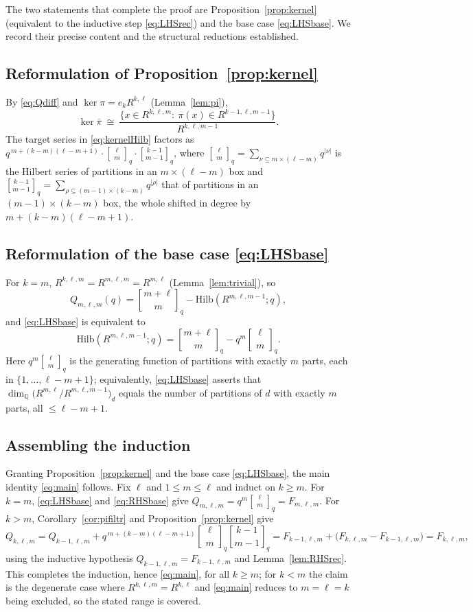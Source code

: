 \documentclass{amsart}
\theoremstyle{definition}
\newcommand{\Hilb}{\mathrm{Hilb}}
\newcommand{\qbin}[2]{\genfrac{[}{]}{0pt}{}{#1}{#2}_q}
\newcommand{\Q}{\mathbb{Q}}
\newcommand{\rkl}{R^{k,\ell}}
\newcommand{\Rklm}{R^{k,\ell,m}}
\begin{document}
The two statements that complete the proof are Proposition~\ref{prop:kernel}
(equivalent to the inductive step \eqref{eq:LHSrec}) and the base case
\eqref{eq:LHSbase}. We record their precise content and the structural reductions
established.

\subsection*{Reformulation of Proposition~\ref{prop:kernel}}
By \eqref{eq:Qdiff} and $\ker\pi=e_k\rkl$ (Lemma~\ref{lem:pi}),
\[
\ker\overline\pi\ \cong\
\frac{\{x\in\Rklm:\ \pi(x)\in R^{k-1,\ell,m-1}\}}{R^{k,\ell,m-1}} .
\]
The target series in \eqref{eq:kernelHilb} factors as
$q^{\,m+(k-m)(\ell-m+1)}\cdot\qbin{\ell}{m}\cdot\qbin{k-1}{m-1}$, where
$\qbin{\ell}{m}=\sum_{\nu\subseteq m\times(\ell-m)}q^{|\nu|}$ is the Hilbert series
of partitions in an $m\times(\ell-m)$ box and
$\qbin{k-1}{m-1}=\sum_{\rho\subseteq(m-1)\times(k-m)}q^{|\rho|}$ that of partitions
in an $(m-1)\times(k-m)$ box, the whole shifted in degree by $m+(k-m)(\ell-m+1)$.

\subsection*{Reformulation of the base case \eqref{eq:LHSbase}}
For $k=m$, $\Rklm=R^{m,\ell,m}=R^{m,\ell}$ (Lemma~\ref{lem:trivial}), so
\[
Q_{m,\ell,m}(q)=\qbin{m+\ell}{m}-\Hilb(R^{m,\ell,m-1};q),
\]
and \eqref{eq:LHSbase} is equivalent to
\begin{equation}\label{eq:basecum}
\Hilb(R^{m,\ell,m-1};q)=\qbin{m+\ell}{m}-q^{m}\qbin{\ell}{m}.
\end{equation}
Here $q^{m}\qbin{\ell}{m}$ is the generating function of partitions with exactly $m$
parts, each in $\{1,\dots,\ell-m+1\}$; equivalently, \eqref{eq:LHSbase} asserts that
$\dim_\Q\big(R^{m,\ell}/R^{m,\ell,m-1}\big)_d$ equals the number of partitions of $d$
with exactly $m$ parts, all $\le\ell-m+1$.

\subsection*{Assembling the induction}
Granting Proposition~\ref{prop:kernel} and the base case \eqref{eq:LHSbase}, the main
identity \eqref{eq:main} follows. Fix $\ell$ and $1\le m\le\ell$ and induct on
$k\ge m$. For $k=m$, \eqref{eq:LHSbase} and \eqref{eq:RHSbase} give
$Q_{m,\ell,m}=q^m\qbin{\ell}{m}=F_{m,\ell,m}$. For $k>m$,
Corollary~\ref{cor:pifiltr} and Proposition~\ref{prop:kernel} give
\[
Q_{k,\ell,m}=Q_{k-1,\ell,m}+q^{\,m+(k-m)(\ell-m+1)}\qbin{\ell}{m}\qbin{k-1}{m-1}
=F_{k-1,\ell,m}+\big(F_{k,\ell,m}-F_{k-1,\ell,m}\big)=F_{k,\ell,m},
\]
using the inductive hypothesis $Q_{k-1,\ell,m}=F_{k-1,\ell,m}$ and
Lemma~\ref{lem:RHSrec}. This completes the induction, hence \eqref{eq:main}, for all
$k\ge m$; for $k<m$ the claim is the degenerate case where $\Rklm=\rkl$ and
\eqref{eq:main} reduces to $m=\ell=k$ being excluded, so the stated range is covered.
\end{document}
